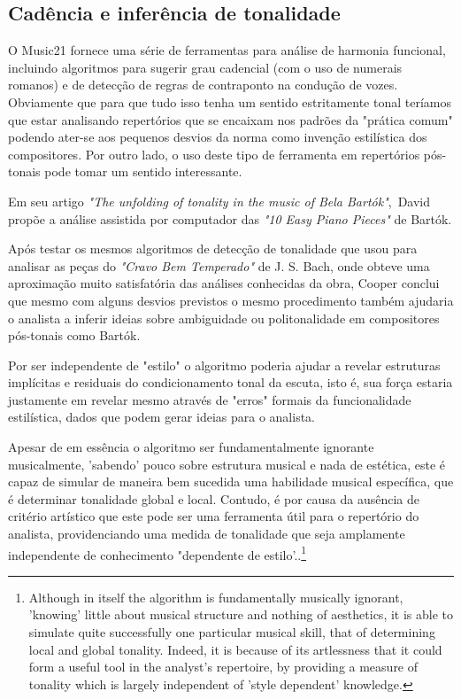 \documentclass[
	12pt,				%
	openright,			%
	twoside,			%
	a4paper,			%
	english,			%
	french,				%
	spanish,			%
	brazil				%
	]{abntex2}
\begin{document}
\subsection{Cadência e inferência de tonalidade}

O Music21 fornece uma série de ferramentas para análise de harmonia funcional, incluindo algoritmos para sugerir grau cadencial (com o uso de numerais romanos) e de detecção de regras de contraponto na condução de vozes. Obviamente que para que tudo isso tenha um sentido estritamente tonal teríamos que estar analisando repertórios que se encaixam nos padrões da "prática comum"\cite[ p.354]{temperley2001cognition} podendo ater-se aos pequenos desvios da norma como invenção estilística dos compositores. Por outro lado, o uso deste tipo de ferramenta em repertórios pós-tonais pode tomar um sentido interessante. 

Em seu artigo \textit{"The unfolding of tonality in the music of Bela Bartók"},\ David  propõe a análise assistida por computador das \textit{"10 Easy Piano Pieces"} de Bartók. 

Após testar os mesmos algoritmos de detecção de tonalidade que usou para analisar as peças do \textit{"Cravo Bem Temperado"} de J. S. Bach, onde obteve uma aproximação muito satisfatória das análises conhecidas da obra, Cooper conclui que mesmo com alguns desvios previstos o mesmo procedimento também ajudaria o analista a inferir ideias sobre ambiguidade ou politonalidade em compositores pós-tonais como Bartók.

Por ser independente de "estilo" o algoritmo poderia ajudar a revelar estruturas implícitas e residuais do condicionamento tonal da escuta, isto é, sua força estaria justamente em revelar mesmo através de "erros" formais da funcionalidade estilística, dados que podem gerar ideias para o analista.

\begin{citacao}
Apesar de em essência o algoritmo ser fundamentalmente ignorante musicalmente, 'sabendo' pouco sobre estrutura musical e nada de estética, este é capaz de simular de maneira bem sucedida uma habilidade musical específica, que é determinar tonalidade global e local. Contudo, é por causa da ausência de critério artístico que este pode ser uma ferramenta útil para o repertório do analista, providenciando uma medida de tonalidade que seja amplamente independente de conhecimento "dependente de estilo'.\cite[ p.34-35]{cooper1998unfolding}.\footnote{Although in itself the algorithm is fundamentally musically ignorant, 'knowing' little about musical structure and nothing of aesthetics, it is able to simulate quite successfully one particular musical skill, that of determining local and global tonality. Indeed, it is because of its artlessness that it could form a useful tool in the analyst's repertoire, by providing a measure of tonality which is largely independent of 'style dependent' knowledge.\cite[ p.34-35]{cooper1998unfolding}}
\end{citacao}
\end{document}
